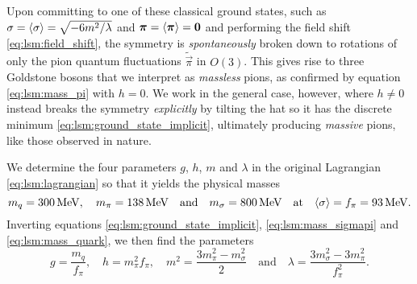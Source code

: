 Upon committing to one of these classical ground states, such as $\sigma=\langle \sigma \rangle=\sqrt{-6m^2/\lambda}$ and ${\bm{\pi}}=\langle {\bm{\pi}} \rangle={\bm{0}}$ and performing the field shift \eqref{eq:lsm:field_shift},
the symmetry is \emph{spontaneously} broken down to rotations of only the pion quantum fluctuations $\tilde{\vec{\pi}}$ in $O(3)$.
This gives rise to three Goldstone bosons that we interpret as \emph{massless} pions, as confirmed by equation \eqref{eq:lsm:mass_pi} with $h = 0$.
We work in the general case, however, where $h \neq 0$ instead breaks the symmetry \emph{explicitly} by tilting the hat so it has the discrete minimum \eqref{eq:lsm:ground_state_implicit}, ultimately producing \emph{massive} pions, like those observed in nature.

We determine the four parameters $g$, $h$, $m$ and $\lambda$ in the original Lagrangian \eqref{eq:lsm:lagrangian} so that it yields the physical masses
\cite{ref:jo_lsm_renormalization}
\begin{equation}
	m_q = \SI{300}{\mega\electronvolt}, \quad
	m_\pi = \SI{138}{\mega\electronvolt} \quad \text{and} \quad
	m_\sigma = \SI{800}{\mega\electronvolt} \quad \text{at} \quad
	\langle \sigma \rangle = f_\pi = \SI{93}{\mega\electronvolt}.
\end{equation}
Inverting equations \eqref{eq:lsm:ground_state_implicit}, \eqref{eq:lsm:mass_sigmapi} and \eqref{eq:lsm:mass_quark}, we then find the parameters
\begin{equation}
	g       = \frac{m_q}{f_\pi}, \quad %
	h       = m_\pi^2 f_\pi, \quad %
	m^2     = \frac{3m_\pi^2 - m_\sigma^2}{2} \quad \text{and} \quad %
	\lambda = \frac{3 m_\sigma^2 - 3 m_\pi^2}{f_\pi^2} .    %
\label{eq:lsm:parameters}
\end{equation}

